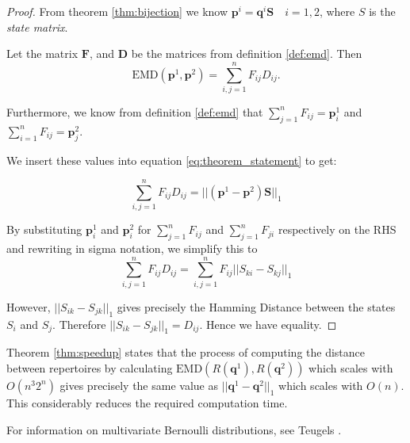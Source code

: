 \begin{proof}
	From theorem \ref{thm:bijection} we know $\mathbf{p}^i = \mathbf{q}^i \mathbf{S} \quad i = 1,2$, where $S$ is the \textit{state matrix}. 
	
	Let the matrix $\mathbf{F}$, and $\mathbf{D}$ be the matrices from definition \ref{def:emd}. Then
	\begin{equation}
	\label{proof1}
	\text{EMD}(\mathbf{p}^1, \mathbf{p}^2) = \sum \limits_{i,j = 1}^n F_{ij} D_{ij}.
	\end{equation}
	
	Furthermore, we know from definition \ref{def:emd} that $\sum \limits_{j=1}^n F_{ij} = \mathbf{p}^1_i$ and $\sum \limits_{i=1}^n F_{ij} = \mathbf{p}^2_j$.
	
	We insert these values into equation \ref{eq:theorem_statement} to get:
	
	\begin{equation}
	\label{proof2}
	\sum \limits_{i,j = 1}^n F_{ij} D_{ij} = || (\mathbf{p}^1 - \mathbf{p}^2)\mathbf{S}||_1
	\end{equation}
	
	By substituting $\mathbf{p}^1_i$ and $\mathbf{p}^2_i$ for $\sum \limits_{j=1}^n F_{ij}$ and $\sum \limits_{j=1}^n F_{ji}$ respectively on the RHS and rewriting in sigma notation, we simplify this to
	\begin{equation}
	\label{proof3}
	\sum \limits_{i,j = 1}^n F_{ij} D_{ij} = \sum \limits_{i,j = 1}^n F_{ij}|| S_{ki} - S_{kj}||_1
	\end{equation}
	
	However, $|| S_{ik} - S_{jk}||_1$ gives precisely the Hamming Distance between the states $S_i$ and $S_j$. Therefore $|| S_{ik} - S_{jk}||_1 = D_{ij}$. Hence we have equality.
\end{proof}

\begin{remark}
	Theorem \ref{thm:speedup} states that the process of computing the distance between repertoires by calculating $\text{EMD}(R(\mathbf{q}^1), R(\mathbf{q}^2))$ which scales with $O(n^3 2^n)$ gives precisely the same value as $||\mathbf{q}^1-\mathbf{q}^2||_1$ which scales with $O(n)$. This considerably reduces the required computation time.	
\end{remark}
	


\begin{remark}
	For  information on multivariate Bernoulli distributions, see Teugels \cite{teugels1990some}.
\end{remark}



